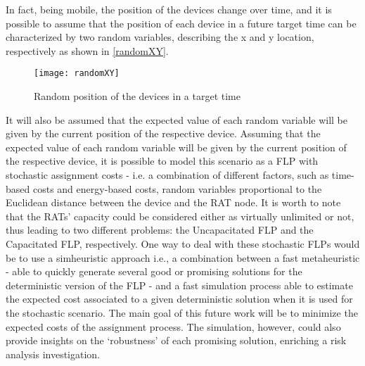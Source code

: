 \documentclass[twoside,openright]{report}
\begin{document}
In fact, being mobile, the position of the devices change over time, and it is possible to assume that the position of each device in a future target time can be characterized by two random variables, describing the x and y location, respectively as shown in \autoref{randomXY}. 
\begin{figure}[htbp]
\centering
\texttt{[image: randomXY]}
\caption{Random position of the devices in a target time}
\label{randomXY}
\end{figure}

It will also be assumed that the expected value of each random variable will be given by the current position of the respective device. Assuming that the expected value of each random variable will be given by the current position of the respective device, it is possible to model this scenario as a \gls{FLP} with stochastic assignment costs - i.e. a combination of different factors, such as time-based costs and energy-based costs, random variables proportional to the Euclidean distance between the device and the \gls{RAT} node. 
It is worth to note that the \glspl{RAT}’ capacity could be considered either as virtually unlimited or not, thus leading to two different problems: the Uncapacitated \gls{FLP} and the Capacitated \gls{FLP}, respectively.
One way to deal with these stochastic  \glspl{FLP} would be to use a simheuristic approach \cite{Juan2015} i.e., a combination between a fast metaheuristic - able to quickly generate several good or promising solutions for the deterministic version of the \gls{FLP} - and a fast simulation process able to estimate the expected cost associated to a given deterministic solution when it is used for the stochastic scenario. 
The main goal of this future work will be to minimize the expected costs of the assignment process. 
The simulation, however, could also provide insights on the ‘robustness’ of each promising solution, enriching a risk analysis investigation.
\end{document}
